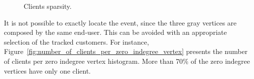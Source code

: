 \begin{figure}[H]
    \centering
    \caption{Clients sparsity.}
\label{fig:clients_sparsity}
\end{figure}%

It is not possible to exactly locate the event,
since the three gray vertices are composed by the same end-user.
This can be avoided with an appropriate selection of the tracked customers.
For instance,
Figure~\ref{fig:number_of_clients_per_zero_indegree_vertex} presents
the number of clients per zero indegree vertex histogram.
More than 70\% of the zero indegree vertices have only one client.

